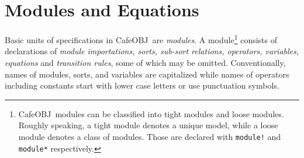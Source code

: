 \documentclass[12pt]{report}
\newcommand{\cafeobj}{{\sf CafeOBJ}~}
\begin{document}
\section{Modules and Equations}
\label{sec:module}
Basic units of specifications in \cafeobj are {\it modules}.  A
module\footnote{\cafeobj modules can be classified into tight modules
  and loose modules. Roughly speaking, a tight module denotes a unique
  model, while a loose module denotes a class of modules. Those are
  declared with {\tt module!} and {\tt module*} respectively.}
consists of declarations of {\it module importations, sorts, sub-sort
  relations, operators, variables, equations} and {\it transition
  rules}, some of which may be omitted. Conventionally, names of
modules, sorts, and variables are capitalized while names of operators
including constants start with lower case letters or use punctuation
symbols.
\end{document}
